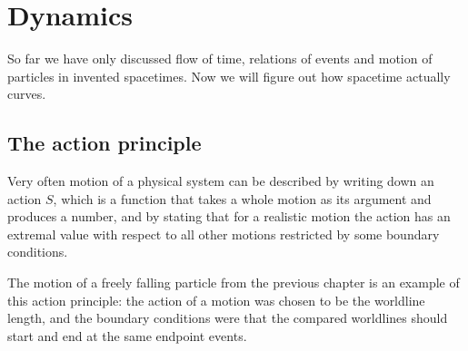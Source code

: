 \documentclass[11pt,oneside%
]{memoir}
\newenvironment{eqna}{\begin{IEEEeqnarray*}{c}}{\end{IEEEeqnarray*}\ignorespacesafterend}
\newcommand{\andd}{\qquad\textrm{and}\qquad}
\newcommand{\dd}{\mathrm{d}}
\begin{document}
%
%





\chapter{Dynamics}

So far we have only discussed flow of time, relations of events and motion of particles in invented spacetimes. Now we will figure out how spacetime actually curves.

%

\section{The action principle}

Very often motion of a physical system can be described by writing down an action \(S\), which is a function that takes a whole motion as its argument and produces a number, and by stating that for a realistic motion the action has an extremal value with respect to all other motions restricted by some boundary conditions.

The motion of a freely falling particle from the previous chapter is an example of this action principle: the action of a motion was chosen to be the worldline length, and the boundary conditions were that the compared worldlines should start and end at the same endpoint events.
\end{document}
